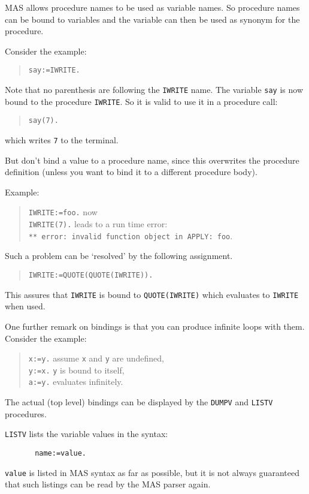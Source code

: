 MAS allows procedure names to be used as variable names. 
So procedure names can be bound to variables and the 
variable can then be used as synonym for the procedure.

Consider the example:
\begin{quote}
       \verb/say:=IWRITE./ 
\end{quote}
Note that no parenthesis are following the \verb/IWRITE/ name.
The variable \verb/say/ is now bound to the 
procedure \verb/IWRITE/. So it is valid to 
use it in a procedure call:
\begin{quote}
       \verb/say(7)./   
\end{quote}
which writes \verb/7/ to the terminal.

But don't bind a value to a procedure name, since this 
overwrites the procedure definition (unless you want to
bind it to a different procedure body).

Example:
\begin{quote}
       \verb/IWRITE:=foo./ now \\
       \verb/IWRITE(7)./ leads to a run time error: \\
       \verb/** error: invalid function object in APPLY: foo/.
\end{quote}
Such a problem can be `resolved' by the following 
assignment.
\begin{quote}
       \verb/IWRITE:=QUOTE(QUOTE(IWRITE))./
\end{quote}
This assures that \verb/IWRITE/ is bound to 
\verb/QUOTE(IWRITE)/ which evaluates to
\verb/IWRITE/ when used.

One further remark on bindings is that you can produce 
infinite loops with them. 
Consider the example:
\begin{quote}
       \verb/x:=y./ assume \verb/x/ and \verb/y/ are undefined, \\
       \verb/y:=x./ \verb/y/ is bound to itself, \\
       \verb/a:=y./ evaluates infinitely.
\end{quote}

The actual (top level) bindings can be displayed
by the \verb/DUMPV/ and \verb/LISTV/ procedures. 

\verb/LISTV/ lists the variable values in the syntax:
\begin{verbatim}
       name:=value.
\end{verbatim}
\verb/value/ is listed in MAS syntax as far as possible,
but it is not always guaranteed that such listings
can be read by the MAS parser again.

